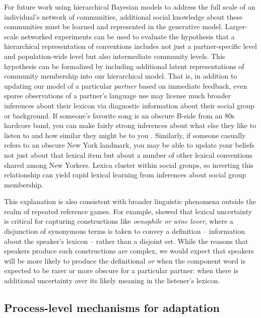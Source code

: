 For future work using hierarchical Bayesian models to address the full scale of an individual's  network of communities, additional social knowledge about these communities must be learned and represented in the generative model.
Larger-scale networked experiments can be used to evaluate the hypothesis that a hierarchical representation of conventions includes not just a partner-specific level and population-wide level but also intermediate community levels. 
This hypothesis can be formalized by including additional latent representations of community membership into our hierarchical model.
That is, in addition to updating our model of a particular \emph{partner} based on immediate feedback, even sparse observations of a partner's language use may license much broader inferences about their lexicon via diagnostic information about their social group or background. 
If someone's favorite song is an obscure B-side from an 80s hardcore band, you can make fairly strong inferences about what else they like to listen to and how similar they might be to you \cite{VelezEtAl16_Overlaps, GershmanEtAl17_StructureSocialInfluence}. 
Similarly, if someone casually refers to an obscure New York landmark, you may be able to update your beliefs not just about that lexical item but about a number of other lexical conventions shared among New Yorkers. 
Lexica cluster within social groups, so inverting this relationship can yield rapid lexical learning from inferences about social group membership.

This explanation is also consistent with broader linguistic phenomena outside the realm of repeated reference games. 
For example,  showed that lexical uncertainty is critical for capturing constructions like \emph{oenophile or wine lover}, where a disjunction of synonymous terms is taken to convey a definition -- information about the speaker's lexicon -- rather than a disjoint set. 
While the reasons that speakers produce such constructions are complex, we would expect that speakers will be more likely to produce the definitional \emph{or} when the component word is expected to be rarer or more obscure for a particular partner: when there is additional uncertainty over its likely meaning in the listener's lexicon.


\subsection{Process-level mechanisms for adaptation}

